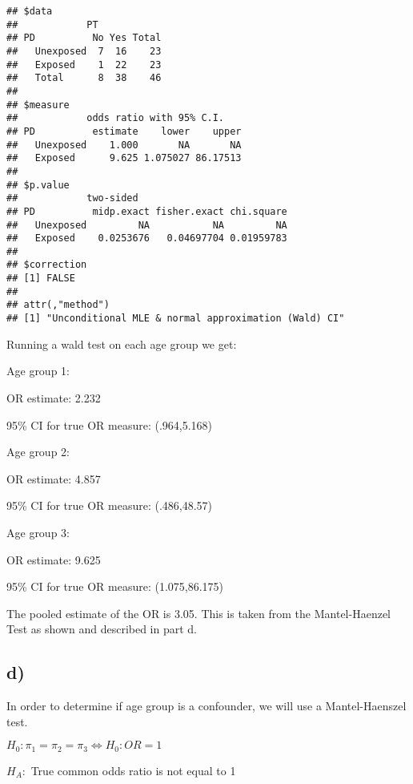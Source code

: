 \documentclass[]{article}
\begin{document}
\begin{verbatim}
## $data
##            PT
## PD          No Yes Total
##   Unexposed  7  16    23
##   Exposed    1  22    23
##   Total      8  38    46
## 
## $measure
##            odds ratio with 95% C.I.
## PD          estimate    lower    upper
##   Unexposed    1.000       NA       NA
##   Exposed      9.625 1.075027 86.17513
## 
## $p.value
##            two-sided
## PD          midp.exact fisher.exact chi.square
##   Unexposed         NA           NA         NA
##   Exposed    0.0253676   0.04697704 0.01959783
## 
## $correction
## [1] FALSE
## 
## attr(,"method")
## [1] "Unconditional MLE & normal approximation (Wald) CI"
\end{verbatim}

Running a wald test on each age group we get:

Age group 1:

OR estimate: 2.232

95\% CI for true OR measure: (.964,5.168)

Age group 2:

OR estimate: 4.857

95\% CI for true OR measure: (.486,48.57)

Age group 3:

OR estimate: 9.625

95\% CI for true OR measure: (1.075,86.175)

The pooled estimate of the OR is 3.05. This is taken from the
Mantel-Haenzel Test as shown and described in part d.

\subsection{d)}\label{d-1}

In order to determine if age group is a confounder, we will use a
Mantel-Haenszel test.

\(H_0: \pi_1=\pi_2=\pi_3 \iff H_0: OR=1\)

\(H_A:\) True common odds ratio is not equal to 1
\end{document}
